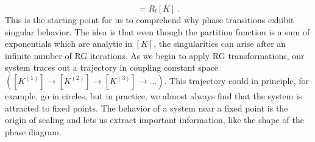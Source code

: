 	\begin{equation}
		[K^l] =	R_l[K]~.
	\end{equation}
	This is the starting point for us to comprehend why phase transitions exhibit singular behavior. The idea is that even though the partition function is a sum of exponentials which are analytic in $[K]$, the singularities can arise after an infinite number of RG iterations. As we begin to apply RG transformations, our system traces out a trajectory in coupling constant space $\left([K^{(1)}] \rightarrow [K^{(2)}] \rightarrow [K^{(3)}] \rightarrow ...\right)$. This trajectory could in principle, for example, go in circles, but in practice, we almost always find that the system is attracted to fixed points. The behavior of a system near a fixed point is the origin of scaling and lets us extract important information, like the shape of the phase diagram.
	
